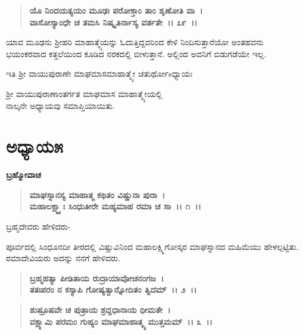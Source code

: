 \begin{verse}
\textbf{ಯೊ ನಿಂದಯತ್ಯಯಂ ಮೂಢಃ ಪರೋಕ್ತಾಂ ತಾಂ ಶೃಣೋತಿ ವಾ~।}\\\textbf{ವಾಸೋಸ್ಯಾಂಧೇ ಚ ತಮಸಿ ನಿಷ್ಕೃತಿರ್ನಾಸ್ಯ ವರ್ತತೇ~।। ೭೯~।।}
\end{verse}

ಯಾವ ಮೂಢನು ಶ‍್ರೀಹರಿ ಮಾಹಾತ್ಮ್ಯೆಯನ್ನು ಓದುತ್ತಿದ್ದವರಿಂದ ಕೇಳಿ ನಿಂದಿಸುತ್ತಾನೆಯೋ ಅಂತಹವನು ಭಯಂಕರವಾದ ಕತ್ತಲೆಯಿಂದ ಕೂಡಿದ ನರಕದಲ್ಲಿ ಬೀಳುತ್ತಾನೆ. ಅಲ್ಲಿಂದ ಅವನಿಗೆ ಬಿಡುಗಡೆಯೇ ಇಲ್ಲ.

\begin{center}
ಇತಿ ಶ‍್ರೀ ವಾಯುಪುರಾಣೇ ಮಾಘಮಾಸಮಾಹಾತ್ಮ್ಯೇ ಚತುರ್ಥೋsಧ್ಯಾಯಃ
\end{center}

\begin{center}
 ಶ‍್ರೀ ವಾಯುಪುರಾಣಾಂತರ್ಗತ ಮಾಘಮಾಸ ಮಾಹಾತ್ಮ್ಯೇಯಲ್ಲಿ \\ ನಾಲ್ಕನೇ ಅಧ್ಯಾಯವು ಸಮಾಪ್ತಿಯಾಯಿತು.
\end{center}

\newpage

\section*{ಅಧ್ಯಾಯ\enginline{-}೫}

\emptypage

\begin{flushleft}
\textbf{ಬ್ರಹ್ಮೋವಾಚ\enginline{-}}
\end{flushleft}

\begin{verse}
\textbf{ಮಾಘಸ್ನಾನಸ್ಯ ಮಾಹಾತ್ಮ ಕಥಿತಂ ವಿಷ್ಣುನಾ ಪುರಾ~। }\\\textbf{ಮಹಾಲಕ್ಷ್ಮ್ಯಾಃ ಸಿಂಧುತೀರೇ ಮಹ್ಯಮಾಹ ರಮಾ ಚ ಸಾ~।। ೧~।।}
\end{verse}

\begin{flushleft}
ಬ್ರಹ್ಮದೇವರು ಹೇಳಿದರು-
\end{flushleft}

ಪೂರ್ವದಲ್ಲಿ ಸಿಂಧೂನದೀ ತೀರದಲ್ಲಿ ವಿಷ್ಣುವಿನಿಂದ ಮಹಾಲಕ್ಷ್ಮಿಗೋಸ್ಕರ ಮಾಘಸ್ನಾನದ ಮಹಿಮೆಯು ಹೇಳಲ್ಪಟ್ಟಿತು. ರಮಾದೇವಿಯರು ಅದನ್ನು ನನಗೆ ಹೇಳಿದರು.

\begin{verse}
\textbf{ಬ್ರಹ್ಮಹತ್ಯಾ ಪೀಡಿತಾಯ ರುದ್ರಾಯಾವೋಚನಂಗಜ~।}\\\textbf{ತತಃಪರಂ ನ ಕಸ್ಯಾಪಿ ಗೋಷ್ಯತ್ವಾನ್ನೋದಿತಂ ತ್ವಿದಮ್~।। ೨~।।} 
\end{verse}

\begin{verse}
\textbf{ಶುಷ್ರೂಷವೇ ಚ ಪುತ್ರಾಯ ಶ್ರದ್ದಧಾನಾಯ ಧೀಮತೇ~।}\\\textbf{ವಕ್ಷ್ಯಾಮಿ ಪರಮಂ ಗುಹ್ಯಂ ಮಾಘಮಾಹಾತ್ಮ್ಯ ಮುತ್ತಮಮ್~।। ೩~।।}
\end{verse}

